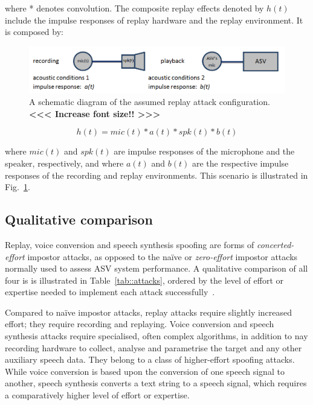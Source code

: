 \noindent where * denotes convolution.  The composite replay effects denoted by $h(t)$ include the impulse responses of replay hardware and the replay environment.  It is composed by:


\begin{figure}
	\includegraphics[width=1\linewidth]{Figs/replay.png}
	\caption{A schematic diagram of the assumed replay attack configuration. {\bfseries <<< Increase font size!! >>>}}
	\label{fig::Replay}
\end{figure}

\begin{equation}
h(t) = mic(t) * a(t) * spk(t) * b(t)
\label{eq::playback}
\end{equation}


\noindent where $mic(t)$ and $spk(t)$ are impulse responses of the microphone and the speaker, respectively, and where $a(t)$ and $b(t)$ are the respective impulse responses of the recording and replay environments.  This scenario is illustrated in Fig.~\ref{fig::Replay}.




\subsection{Qualitative comparison}
\label{sec::algorithms::comparison}

Replay, voice conversion and speech synthesis spoofing are forms of \emph{concerted-effort} impostor attacks, as opposed to the na\"{i}ve or \emph{zero-effort} impostor attacks normally used to assess ASV system performance.  A qualitative comparison of all four is is illustrated in Table~\ref{tab::attacks}, ordered by the level of effort or expertise needed to implement each attack successfully~\cite{Wu2014a}. 

Compared to na\"{i}ve impostor attacks, replay attacks require slightly increased effort; they require recording and replaying. Voice conversion and speech synthesis attacks require specialised, often complex algorithms, in addition to nay recording hardware to collect, analyse and parametrise the target and any other auxiliary speech data.  They belong to a class of higher-effort spoofing attacks.  While voice conversion is based upon the conversion of one speech signal to another, speech synthesis converts a text string to a speech signal, which requires a comparatively higher level of effort or expertise.

